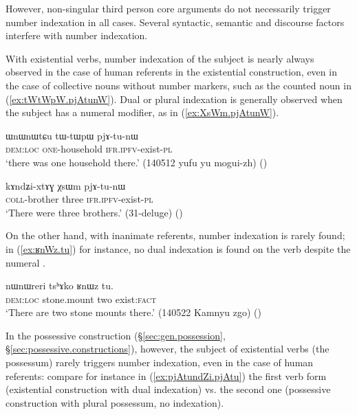 However, non-singular third person core arguments do not necessarily trigger number indexation in all cases. Several syntactic, semantic and discourse factors interfere with number indexation.

With existential verbs, number indexation of the subject is nearly always observed in the case of human referents in the existential construction, even in the case of collective nouns without number markers, such as the counted noun  in (\ref{ex:tWtWpW.pjAtunW}). Dual or plural indexation is generally observed when the subject has a numeral modifier, as in (\ref{ex:XsWm.pjAtunW}). 


\begin{exe}
\ex \label{ex:tWtWpW.pjAtunW}
\gll  ɯnɯnɯtɕu tɯ-tɯpɯ pjɤ-tu-nɯ \\
\textsc{dem}:\textsc{loc} \textsc{one}-household \textsc{ifr}.\textsc{ipfv}-exist-\textsc{pl} \\
\glt `there was one household there.' (140512 yufu yu mogui-zh) ()
\end{exe}

\begin{exe}
\ex \label{ex:XsWm.pjAtunW}
\gll kɤndʑi-xtɤɣ χsɯm pjɤ-tu-nɯ \\
\textsc{coll}-brother three \textsc{ifr}.\textsc{ipfv}-exist-\textsc{pl} \\
\glt `There were three brothers.' (31-deluge) 	()
\end{exe}

On the other hand, with inanimate referents, number indexation is rarely found; in (\ref{ex:ʁnWz.tu}) for instance, no dual indexation is found on the verb despite the numeral .

\begin{exe}
\ex \label{ex:ʁnWz.tu}
\gll  nɯnɯreri tsʰɤko ʁnɯz tu. \\
\textsc{dem}:\textsc{loc} stone.mount two exist:\textsc{fact} \\
\glt `There are two stone mounts there.' (140522 Kamnyu zgo) ()
\end{exe}

In the possessive construction (§\ref{sec:gen.possession}, §\ref{sec:possessive.constructions}), however, the subject of existential verbs (the possessum) rarely triggers number indexation, even in the case of human referents: compare for instance in (\ref{ex:pjAtundZi.pjAtu}) the first verb form  (existential construction with dual indexation) vs. the second one  (possessive construction with plural possessum, no indexation).

